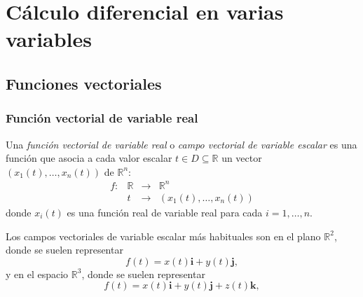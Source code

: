 \section{Cálculo diferencial en varias variables}

\subsection{Funciones vectoriales}

\begin{frame}
	\frametitle{Función vectorial de variable real}
	
	\begin{definicion}
		Una \emph{función vectorial de variable real} o \emph{campo vectorial de variable escalar} es una función que asocia a cada valor escalar $t\in D\subseteq \mathbb{R}$ un vector $(x_1(t),\ldots,x_n(t))$ de $\mathbb{R}^n$:
		\[
			\begin{array}{rccl}
				f: & \mathbb{R} & \longrightarrow & \mathbb{R}^n            \\
				   & t          & \longrightarrow & (x_1(t),\ldots, x_n(t)) 
			\end{array}
		\] 
		donde $x_i(t)$ es una función real de variable real para cada $i=1,\ldots,n$.
	\end{definicion}
	
	Los campos vectoriales de variable escalar más habituales son en el plano $\mathbb{R}^2$, donde se suelen representar
	\[
		f(t)=x(t)\mathbf{i}+y(t)\mathbf{j},
	\]
	y en el espacio $\mathbb{R}^3$, donde se suelen representar 
	\[
		f(t)=x(t)\mathbf{i}+y(t)\mathbf{j}+z(t)\mathbf{k},
	\]
\end{frame}


